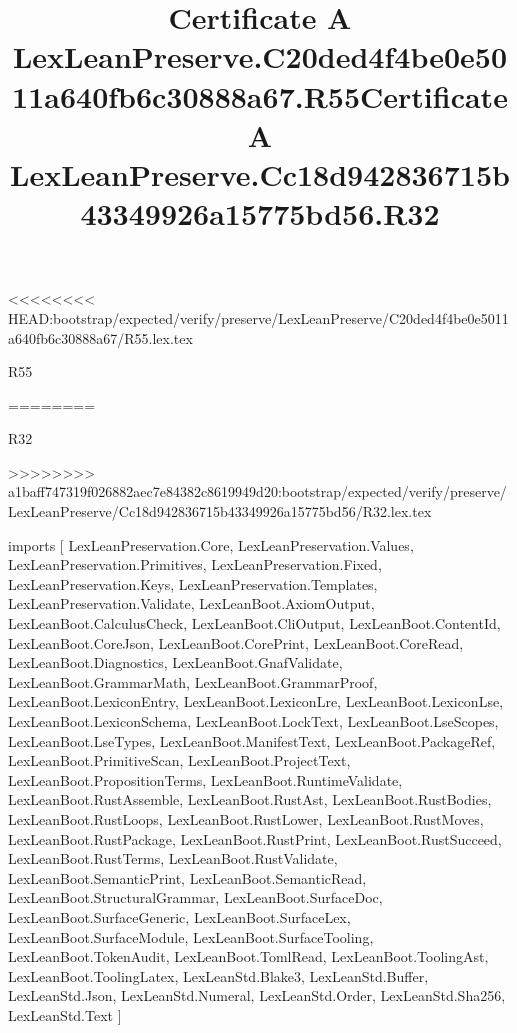 <<<<<<<< HEAD:bootstrap/expected/verify/preserve/LexLeanPreserve/C20ded4f4be0e5011a640fb6c30888a67/R55.lex.tex
\begin{lexlean}{R55}
\title{Certificate A LexLeanPreserve.C20ded4f4be0e5011a640fb6c30888a67.R55}
========
\begin{lexlean}{R32}
\title{Certificate A LexLeanPreserve.Cc18d942836715b43349926a15775bd56.R32}
>>>>>>>> a1baff747319f026882aec7e84382c8619949d20:bootstrap/expected/verify/preserve/LexLeanPreserve/Cc18d942836715b43349926a15775bd56/R32.lex.tex
\begin{coremodule}
imports [
  LexLeanPreservation.Core,
  LexLeanPreservation.Values,
  LexLeanPreservation.Primitives,
  LexLeanPreservation.Fixed,
  LexLeanPreservation.Keys,
  LexLeanPreservation.Templates,
  LexLeanPreservation.Validate,
  LexLeanBoot.AxiomOutput,
  LexLeanBoot.CalculusCheck,
  LexLeanBoot.CliOutput,
  LexLeanBoot.ContentId,
  LexLeanBoot.CoreJson,
  LexLeanBoot.CorePrint,
  LexLeanBoot.CoreRead,
  LexLeanBoot.Diagnostics,
  LexLeanBoot.GnafValidate,
  LexLeanBoot.GrammarMath,
  LexLeanBoot.GrammarProof,
  LexLeanBoot.LexiconEntry,
  LexLeanBoot.LexiconLre,
  LexLeanBoot.LexiconLse,
  LexLeanBoot.LexiconSchema,
  LexLeanBoot.LockText,
  LexLeanBoot.LseScopes,
  LexLeanBoot.LseTypes,
  LexLeanBoot.ManifestText,
  LexLeanBoot.PackageRef,
  LexLeanBoot.PrimitiveScan,
  LexLeanBoot.ProjectText,
  LexLeanBoot.PropositionTerms,
  LexLeanBoot.RuntimeValidate,
  LexLeanBoot.RustAssemble,
  LexLeanBoot.RustAst,
  LexLeanBoot.RustBodies,
  LexLeanBoot.RustLoops,
  LexLeanBoot.RustLower,
  LexLeanBoot.RustMoves,
  LexLeanBoot.RustPackage,
  LexLeanBoot.RustPrint,
  LexLeanBoot.RustSucceed,
  LexLeanBoot.RustTerms,
  LexLeanBoot.RustValidate,
  LexLeanBoot.SemanticPrint,
  LexLeanBoot.SemanticRead,
  LexLeanBoot.StructuralGrammar,
  LexLeanBoot.SurfaceDoc,
  LexLeanBoot.SurfaceGeneric,
  LexLeanBoot.SurfaceLex,
  LexLeanBoot.SurfaceModule,
  LexLeanBoot.SurfaceTooling,
  LexLeanBoot.TokenAudit,
  LexLeanBoot.TomlRead,
  LexLeanBoot.ToolingAst,
  LexLeanBoot.ToolingLatex,
  LexLeanStd.Blake3,
  LexLeanStd.Buffer,
  LexLeanStd.Json,
  LexLeanStd.Numeral,
  LexLeanStd.Order,
  LexLeanStd.Sha256,
  LexLeanStd.Text
]


\end{coremodule}
\end{lexlean}
\end{lexlean}
